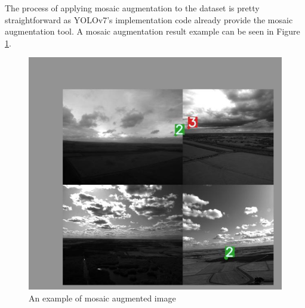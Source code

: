 The process of applying mosaic augmentation to the dataset is pretty straightforward as YOLOv7's implementation code
already provide the mosaic augmentation tool. A mosaic augmentation result example can be seen in Figure \ref{fig:mosaic-train}.
  \begin{figure}
    \centering
    \includegraphics[scale=0.4]{figures/mosaic-aug-2.png}
    \caption{An example of mosaic augmented image}
    \label{fig:mosaic-train}
  \end{figure}

